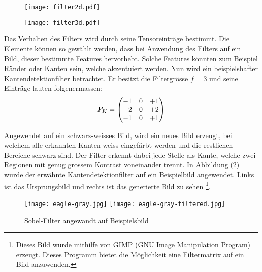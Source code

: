 \begin{figure}[h!]
  \centering
  \begin{minipage}{0.4\textwidth}
    \centering
    \texttt{[image: filter2d.pdf]}
    \label{fig:filter2d}
  \end{minipage}\hspace{1cm}%
  \begin{minipage}{0.5\textwidth}
    \centering
    \texttt{[image: filter3d.pdf]}
    \label{fig:filter3d}
  \end{minipage}
\end{figure}
\para{}
Das Verhalten des Filters wird durch seine Tensoreinträge bestimmt.
Die Elemente können so gewählt werden, dass bei Anwendung des Filters auf
ein Bild, dieser bestimmte Features hervorhebt. Solche Features
könnten zum Beispiel Ränder oder Kanten sein, welche akzentuiert werden.
\para{}
Nun wird ein beispielshafter Kantendetektionfilter betrachtet. Er besitzt die
Filtergrösse $f=3$ und seine Einträge lauten folgenermassen:
\begin{equation*}
  \bm{F}_K =
  \begin{pmatrix}
    -1 & 0 & +1 \\
    -2 & 0 & +2 \\
    -1 & 0 & +1 \\
  \end{pmatrix}
\end{equation*}

Angewendet auf ein schwarz-weisses Bild, wird ein neues Bild erzeugt, bei welchem alle erkannten
Kanten weiss eingefärbt werden und die restlichen Bereiche schwarz sind.
Der Filter erkennt dabei jede Stelle als Kante, welche zwei Regionen mit
genug grossem Kontrast voneinander trennt.
In Abbildung (\ref{fig:sobel_filter}) wurde der erwähnte Kantendetektionfilter auf ein
Beispielbild angewendet. Links ist das Ursprungsbild und rechts ist das
generierte Bild zu sehen
\footnote{
  Dieses Bild wurde mithilfe von GIMP (GNU Image Manipulation Program) erzeugt. Dieses
  Programm bietet die Möglichkeit eine Filtermatrix auf ein Bild anzuwenden.
}.

\begin{figure}[h!]
  \centering
  \texttt{[image: eagle-gray.jpg]}
  \texttt{[image: eagle-gray-filtered.jpg]}
  \caption{Sobel-Filter angewandt auf Beispielsbild \cite{res:eagle_image}}
  \label{fig:sobel_filter}
\end{figure}

